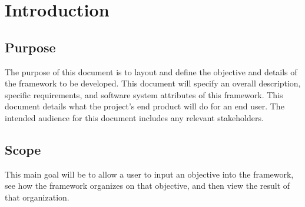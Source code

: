 \documentclass[draftclsnofoot, onecolumn, compsoc, 10pt]{IEEEtran}
\begin{document}
\section{Introduction}
\subsection{Purpose} 
The purpose of this document is to layout and define the objective and details of the framework to be developed. This document will specify an overall description, specific requirements, and software system attributes of this framework. This document details what the project's end product will do for an end user. The intended audience for this document includes any relevant stakeholders. 

\subsection{Scope}
This main goal will be to allow a user to input an objective into the framework, see how the framework organizes on that objective, and then view the result of that organization. 

\end{document}
